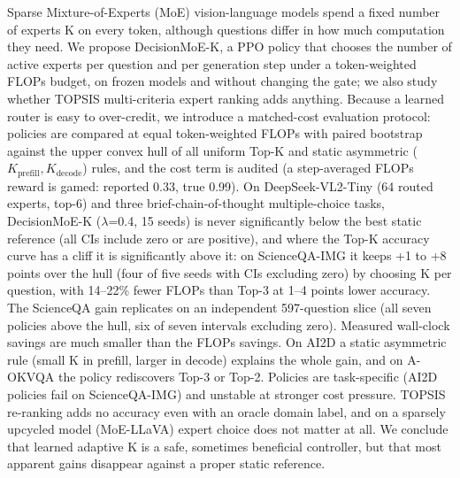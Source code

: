 Sparse Mixture-of-Experts (MoE) vision-language models spend a fixed number of experts K on every token, although questions differ in how much computation they need. We propose DecisionMoE-K, a PPO policy that chooses the number of active experts per question and per generation step under a token-weighted FLOPs budget, on frozen models and without changing the gate; we also study whether TOPSIS multi-criteria expert ranking adds anything. Because a learned router is easy to over-credit, we introduce a matched-cost evaluation protocol: policies are compared at equal token-weighted FLOPs with paired bootstrap against the upper convex hull of all uniform Top-K and static asymmetric ($K_{\mathrm{prefill}}, K_{\mathrm{decode}}$) rules, and the cost term is audited (a step-averaged FLOPs reward is gamed: reported 0.33, true 0.99).
On DeepSeek-VL2-Tiny (64 routed experts, top-6) and three brief-chain-of-thought multiple-choice tasks, DecisionMoE-K ($\lambda$=0.4, 15 seeds) is never significantly below the best static reference (all CIs include zero or are positive), and where the Top-K accuracy curve has a cliff it is significantly above it: on ScienceQA-IMG it keeps +1 to +8 points over the hull (four of five seeds with CIs excluding zero) by choosing K per question, with 14--22\% fewer FLOPs than Top-3 at 1--4 points lower accuracy. The ScienceQA gain replicates on an independent 597-question slice (all seven policies above the hull, six of seven intervals excluding zero). Measured wall-clock savings are much smaller than the FLOPs savings. On AI2D a static asymmetric rule (small K in prefill, larger in decode) explains the whole gain, and on A-OKVQA the policy rediscovers Top-3 or Top-2. Policies are task-specific (AI2D policies fail on ScienceQA-IMG) and unstable at stronger cost pressure. TOPSIS re-ranking adds no accuracy even with an oracle domain label, and on a sparsely upcycled model (MoE-LLaVA) expert choice does not matter at all. We conclude that learned adaptive K is a safe, sometimes beneficial controller, but that most apparent gains disappear against a proper static reference.
